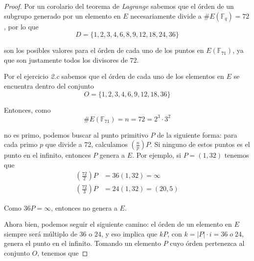 \documentclass[letterpaper,11pt]{article}
\begin{document}
\begin{enumerate}
\begin{enumerate}
\begin{proof}
            Por un corolario del teorema de \textit{Lagrange} sabemos que el órden
            de un subgrupo generado por un elemento en $E$ necesariamente divide 
            a $\#E(\mathbb{F}_q) = 72$, por lo que 
            \begin{equation*}
                D = \{1, 2, 3, 4, 6, 8, 9, 12, 18, 24, 36\}
            \end{equation*}
            
            son los posibles valores para el órden de cada uno de los puntos en 
            $E(\mathbb{F}_{71})$, ya que son justamente todos los divisores de 
            $72$. 
            
            Por el ejercicio \textit{2.c} sabemos que el órden de cada uno de los
            elementos en $E$ se encuentra dentro del conjunto
            \begin{equation*}
                O = \{1, 2, 3, 4, 6, 9, 12, 18, 36\}
            \end{equation*}
            
            Entonces, como 
            \begin{equation*}
                \#E(\mathbb{F}_{71}) = n = 72 = 2^3 \cdot 3^2
            \end{equation*}
            
            no es primo, podemos buscar al punto primitivo $P$ de la siguiente
            forma: para cada primo $p$ que divide a 72, calculamos
            $(\frac{n}{p})P$. Si ninguno de estos puntos es el punto en el
            infinito, entonces $P$ genera a $E$. Por ejemplo, si $P = (1, 32)$
            tenemos que 
            \begin{align*}
                \left(\frac{72}{2}\right) P &= 36(1, 32) = \infty \\
                \left(\frac{72}{3}\right) P &= 24(1, 32) = (20, 5)
            \end{align*}
            
            Como $36P = \infty$, entonces no genera a $E$.
            
            Ahora bien, podemos seguir el siguiente camino: el órden de un
            elemento en $E$ siempre será múltiplo de $36$ o $24$, y eso implica 
            que $kP$, con $k = |P| \cdot i = 36 \; o \; 24$, genera el punto en el
            infinito. Tomando un elemento $P$ cuyo órden pertenezca al conjunto
            $O$, tenemos que 
            

\end{proof}
\end{enumerate}
\end{enumerate}
\end{document}

